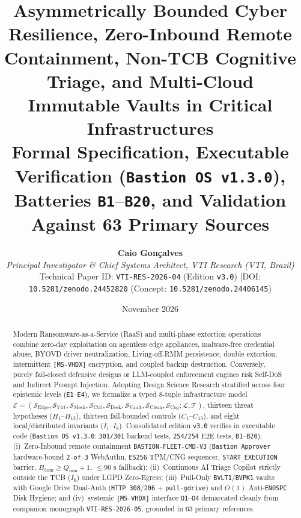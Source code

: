 \documentclass[10pt,twocolumn]{article}
\title{\Large\bfseries Asymmetrically Bounded Cyber Resilience, Zero-Inbound Remote Containment, Non-TCB Cognitive Triage, and Multi-Cloud Immutable Vaults in Critical Infrastructures\\[0.25em]
\large Formal Specification, Executable Verification (\texttt{Bastion OS v1.3.0}), Batteries \texttt{B1}--\texttt{B20}, and Validation Against 63 Primary Sources}
\author{%
  \textbf{Caio Gon\c{c}alves}\\
  \textit{Principal Investigator \& Chief Systems Architect, VTI Research (VTI, Brazil)}\\
  \small Technical Paper ID: \texttt{VTI-RES-2026-04} (Edition \texttt{v3.0}) \quad|\quad DOI: \texttt{10.5281/zenodo.24452820} (Concept: \texttt{10.5281/zenodo.24406145})
}
\date{November 2026}
\begin{document}
\nocite{R01,R02,R03,R04,R05,R06,R07,R08,R09,R10,R11,R12,R13,R14,R15,R16,R17,R18,R19,R20,R21,R22,R23,R24,R25,R26,R27,R28,R29,R30,R31,R32,R33,R34,R35,R36,R37,R38,R39,R40,R41,R42,R43,R44,R45,R46,R47,R48,R49,R50,R51,R52,R53,R54,R55,R56,R57,R58,R59,R60,R61,R62,R63}

\maketitle

\begin{abstract}
\noindent Modern Ransomware-as-a-Service (RaaS) and multi-phase extortion operations combine zero-day exploitation on agentless edge appliances, malware-free credential abuse, BYOVD driver neutralization, Living-off-RMM persistence, double extortion, intermittent \texttt{[MS-VHDX]} encryption, and coupled backup destruction. Conversely, purely fail-closed defensive designs or LLM-coupled enforcement engines risk Self-DoS and Indirect Prompt Injection. Adopting Design Science Research stratified across four epistemic levels (\texttt{E1}--\texttt{E4}), we formalize a typed 8-tuple infrastructure model $\mathcal{E} = (\mathcal{S}_{\mathrm{Edge}}, \mathcal{S}_{\mathrm{Virt}}, \mathcal{S}_{\mathrm{Mesh}}, \mathcal{S}_{\mathrm{Ctrl}}, \mathcal{S}_{\mathrm{Desk}}, \mathcal{S}_{\mathrm{Vault}}, \mathcal{S}_{\mathrm{Clean}}, \mathcal{S}_{\mathrm{Cog}}; \mathcal{L}, \mathcal{T})$, thirteen threat hypotheses ($H_1$--$H_{13}$), thirteen fail-bounded controls ($C_1$--$C_{13}$), and eight local/distributed invariants ($I_1$--$I_8$). Consolidated edition \texttt{v3.0} verifies in executable code (\texttt{Bastion OS v1.3.0}: \texttt{301/301} backend tests, \texttt{254/254} E2E tests, \texttt{B1}--\texttt{B20}): (i)~Zero-Inbound remote containment \texttt{BASTION-FLEET-CMD-V3} (\texttt{Bastion Approver} hardware-bound \texttt{2-of-3} WebAuthn, \texttt{ES256} TPM/CNG sequencer, \texttt{START\_EXECUTION} barrier, $B_{\mathrm{dom}} \ge Q_{\min}+1$, $\le 90\text{ s}$ fallback); (ii)~Continuous AI Triage Copilot strictly outside the TCB ($I_6$) under LGPD Zero-Egress; (iii)~Pull-Only \texttt{BVLT1}/\texttt{BVPK1} vaults with Google Drive Dual-Auth (\texttt{HTTP 308}/\texttt{206} + \texttt{pull-gdrive}) and $O(1)$ Anti-\texttt{ENOSPC} Disk Hygiene; and (iv)~systemic \texttt{[MS-VHDX]} interface \texttt{O1}--\texttt{O4} demarcated cleanly from companion monograph \texttt{VTI-RES-2026-05}, grounded in 63 primary references.
\end{abstract}
\end{document}
